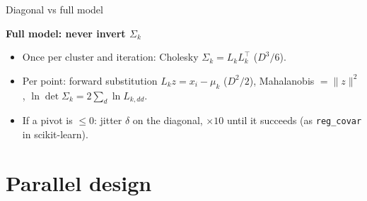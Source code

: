 \documentclass[aspectratio=169,10pt]{beamer}
\begin{document}
\begin{frame}{Diagonal vs full model}
\small
{}

\bigskip
\textbf{Full model: never invert $\Sigma_k$}
\begin{itemize}
\item Once per cluster and iteration: Cholesky $\Sigma_k=L_kL_k^\top$ ($D^3/6$).
\item Per point: forward substitution $L_k z=x_i-\mu_k$ ($D^2/2$), Mahalanobis $=\|z\|^2$, $\ln\det\Sigma_k=2\sum_d\ln L_{k,dd}$.
\item If a pivot is $\le 0$: jitter $\delta$ on the diagonal, $\times10$ until it succeeds (as \texttt{reg\_covar} in scikit-learn).
\end{itemize}
\end{frame}

\section{Parallel design}
\end{document}
